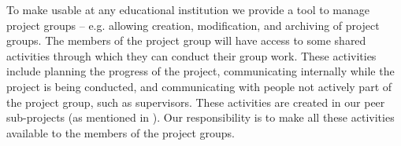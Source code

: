 To make \system{} usable at any educational institution we provide a tool to manage project groups -- e.g. allowing creation, modification, and archiving of project groups.
The members of the project group will have access to some shared activities through which they can conduct their group work.
These activities include planning the progress of the project, communicating internally while the project is being conducted, and communicating with people not actively part of the project group, such as supervisors.
These activities are created in our peer sub-projects (as mentioned in ).
Our responsibility is to make all these activities available to the members of the project groups.




